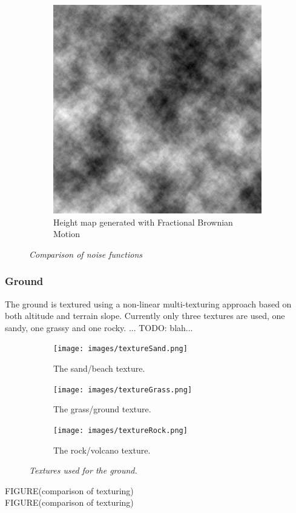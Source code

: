 \begin{figure}[H]
\begin{subfigure}{.5\textwidth}
  \includegraphics[width=0.9\linewidth]{images/FracBrownMotion.png}
  \caption{Height map generated with Fractional Brownian Motion}
  \label{fig:sub2}
\end{subfigure}
\caption[Noise comparison]{\textit{Comparison of noise functions}}
\label{fig:R_kitchen_example}
\end{figure}

\subsubsection{Ground}
The ground is textured using a non-linear multi-texturing approach based on both altitude and terrain slope. Currently only three textures are used, one sandy, one grassy and one rocky. ... TODO: blah...\\
\begin{figure}[H]
\begin{subfigure}{.33\textwidth}
  \centering
  \texttt{[image: images/textureSand.png]}
  \caption{The sand/beach texture.}
  \label{fig:textureSand}
\end{subfigure}%
\begin{subfigure}{.33\textwidth}
  \centering
  \texttt{[image: images/textureGrass.png]}
  \caption{The grass/ground texture.}
  \label{fig:textureGrass}
\end{subfigure}
\begin{subfigure}{.33\textwidth}
  \centering
  \texttt{[image: images/textureRock.png]}
  \caption{The rock/volcano texture.}
  \label{fig:textureRock}
\end{subfigure}
\caption[Ground textures]{\textit{Textures used for the ground.}}
\label{fig:textures}
\end{figure}
FIGURE(comparison of texturing)
\\
FIGURE(comparison of texturing)
\\

